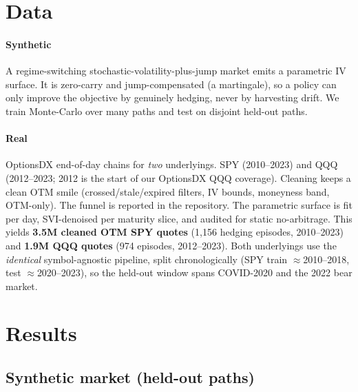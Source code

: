 \documentclass[sigconf,anonymous]{acmart}
\begin{document}
\section{Data}
\label{sec:data}

\paragraph{Synthetic} A regime-switching stochastic-volatility-plus-jump market
emits a parametric IV surface. It is zero-carry and jump-compensated (a
martingale), so a policy can only improve the objective by genuinely hedging,
never by harvesting drift. We train Monte-Carlo over many paths and test on
disjoint held-out paths.

\paragraph{Real} OptionsDX end-of-day chains for \emph{two} underlyings. SPY
(2010--2023) and QQQ (2012--2023; 2012 is the start of our OptionsDX QQQ
coverage). Cleaning keeps a clean OTM smile
(crossed/stale/expired filters, IV bounds, moneyness band, OTM-only). The funnel is
reported in the repository. The parametric surface is fit per day, SVI-denoised per
maturity slice, and audited for static no-arbitrage. This yields \textbf{3.5M
cleaned OTM SPY quotes} (1{,}156 hedging episodes, 2010--2023) and \textbf{1.9M QQQ
quotes} (974 episodes, 2012--2023). Both underlyings use the \emph{identical}
symbol-agnostic pipeline, split chronologically (SPY train $\approx$2010--2018, test
$\approx$2020--2023), so the held-out window spans COVID-2020 and the 2022 bear
market.

\section{Results}
\label{sec:results}

\subsection{Synthetic market (held-out paths)}
\end{document}
